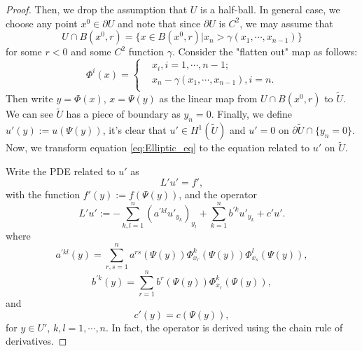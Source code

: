\begin{proof}
    Then, we drop the assumption that $U$ is a half-ball. In general case, we choose any point $x^{0}\in\partial U$ and note that since $\partial U$ is $C^{2}$, we may assume that 
    \begin{equation}
        U\cap B(x^{0},r)=\{x\in B(x^{0},r)|x_{n}>\gamma(x_{1},\cdots,x_{n-1})\}
    \end{equation}
    for some $r<0$ and some $C^{2}$ function $\gamma$. Consider the "flatten out" map as follows:
    \begin{equation}
        \Phi^{i}(x)=\left\{
            \begin{aligned}
                &x_{i},i=1,\cdots,n-1;\\
                &x_{n}-\gamma(x_{1},\cdots,x_{n-1}),i=n.\\
            \end{aligned}
        \right.
    \end{equation}
    Then write $y=\Phi(x)$, $x=\Psi(y)$ as the linear map from $U\cap B(x^{0},r)$ to $\tilde{U}$. We can see $\tilde{U}$ has a piece of boundary as $y_{n}=0$. Finally, we define $u'(y):=u(\Psi(y))$, it's clear that $u'\in H^{1}(\tilde{U})$ and $u'=0$ on $\partial \tilde{U}\cap \{y_{n}=0\}$. Now, we transform equation \eqref{eq:Elliptic_eq} to the equation related to $u'$ on $\tilde{U}$.

    Write the PDE related to $u'$ as 
    \begin{equation}
        \label{eq:modified_equation_for_u}
        L'u'=f',
    \end{equation}
    with the function $f'(y):=f(\Psi(y))$, and the operator 
    \begin{equation}
        L'u':=-\sum_{k,l=1}^{n}(a^{'kl}u'_{y_{k}})_{y_{l}}+\sum_{k=1}^{n}b^{'k}u'_{y_k}+c'u'.
    \end{equation}
    where 
    \begin{equation}
        \label{eq:aprime}
        a^{'kl}(y)=\sum_{r,s=1}^{n}a^{rs}(\Psi(y))\Phi_{x_{r}}^{k}(\Psi(y))\Phi_{x_{s}}^{l}(\Psi(y)),
    \end{equation}
    \begin{equation}
        \label{eq:bprime}
        b^{'k}(y)=\sum_{r=1}^{n}b^{r}(\Psi(y))\Phi_{x_{r}}^{k}(\Psi(y)),
    \end{equation}
    and 
    \begin{equation}
        \label{eq:cprime}
        c'(y)=c(\Psi(y)),
    \end{equation}
    for $y\in U'$, $k,l=1,\cdots,n$. In fact, the operator is derived using the chain rule of derivatives.


\end{proof}
